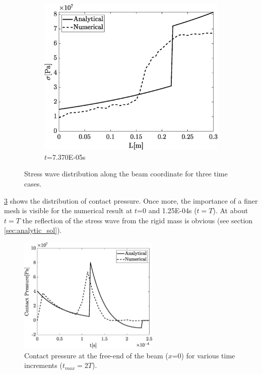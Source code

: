 \documentclass{article}
\begin{document}
\begin{figure}[ht]
        \begin{subfigure}{0.5\textwidth}
            \includegraphics[width=1\linewidth, height=0.8\linewidth]{figures/stress_t3.eps} 
            \caption{$t$=7.370E-05s}
            \label{fig:sigma_t3}
        \end{subfigure}
    \caption{Stress wave distribution along the beam coordinate for three time cases.}
    \label{fig:stress_t1_t3}
\end{figure}

\cref{fig:contact_pressure} shows the distribution of contact pressure. Once more, the importance of a finer mesh is visible for the numerical result at $t$=0 and 1.25E-04s ($t=T$). At about $t=T$ the reflection of the stress wave from the rigid mass is obvious (see section \ref{sec:analytic_sol}).

\begin{figure}[H]
    \centering
    \includegraphics[width = 0.6\textwidth ]{figures/contact_pressure.eps}
    \caption{Contact pressure at the free-end of the beam ($x$=0) for various time increments ($t_{max}=2T$).}
    \label{fig:contact_pressure}
\end{figure}
\end{document}
